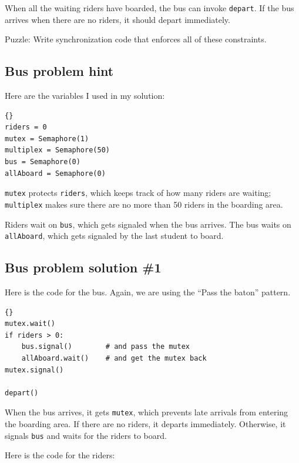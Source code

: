 \documentclass{book}
\newcommand{\clearemptydoublepage}{\newpage\cleardoublepage}
\begin{document}
When all the waiting riders have boarded,
the bus can invoke {\tt depart}.  If the bus arrives when there
are no riders, it should depart immediately.

Puzzle: Write synchronization code that enforces all of these
constraints.


\clearemptydoublepage
\subsection {Bus problem hint}

Here are the variables I used in my solution:

\begin{latin}
\begin{lstlisting}[title={Bus problem hint}]{}
riders = 0
mutex = Semaphore(1)
multiplex = Semaphore(50)
bus = Semaphore(0)
allAboard = Semaphore(0)
\end{lstlisting}
\end{latin}

{\tt mutex} protects {\tt riders}, which keeps track of
how many riders are waiting;
{\tt multiplex} makes sure there are no more than 50 riders
in the boarding area.

Riders wait on
{\tt bus}, which gets signaled when the bus arrives.  The
bus waits on {\tt allAboard}, which gets signaled by the last
student to board.


\clearemptydoublepage
\subsection {Bus problem solution \#1}

Here is the code for the bus.  Again, we are using the
``Pass the baton'' pattern.

\begin{latin}
\begin{lstlisting}[title={Bus problem solution (bus)}]{}
mutex.wait()
if riders > 0:
    bus.signal()        # and pass the mutex
    allAboard.wait()    # and get the mutex back
mutex.signal()

depart()
\end{lstlisting}
\end{latin}

When the bus arrives, it gets {\tt mutex}, which
prevents late arrivals from entering the boarding area.  If there
are no riders, it departs immediately.  Otherwise, it signals {\tt bus}
and waits for the riders to board.

Here is the code for the riders:
\end{document}
